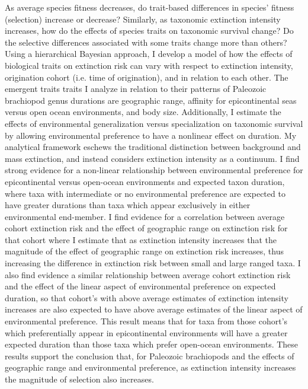 \documentclass[11pt]{article}
\begin{document}
  As average species fitness decreases, do trait-based differences in species' fitness (selection) increase or decrease? Similarly, as taxonomic extinction intensity increases, how do the effects of species traits on taxonomic survival change? Do the selective differences associated with some traits change more than others? Using a hierarchical Bayesian approach, I develop a model of how the effects of biological traits on extinction risk can vary with respect to extinction intensity, origination cohort (i.e. time of origination), and in relation to each other. The emergent traits traits I analyze in relation to their patterns of Paleozoic brachiopod genus durations are geographic range, affinity for epicontinental seas versus open ocean environments, and body size. Additionally, I estimate the effects of environmental generalization versus specialization on taxonomic survival by allowing environmental preference to have a nonlinear effect on duration. My analytical framework eschews the traditional distinction between background and mass extinction, and instead considers extinction intensity as a continuum. I find strong evidence for a non-linear relationship between environmental preference for epicontinental versus open-ocean environments and expected taxon duration, where taxa with intermediate or no environmental preference are expected to have greater durations than taxa which appear exclusively in either environmental end-member. I find evidence for a correlation between average cohort extinction risk and the effect of geographic range on extinction risk for that cohort where I estimate that as extinction intensity increases that the magnitude of the effect of geographic range on extinction risk increases, thus increasing the difference in extinction risk between small and large ranged taxa. I also find evidence a similar relationship between average cohort extinction risk and the effect of the linear aspect of environmental preference on expected duration, so that cohort's with above average estimates of extinction intensity increases are also expected to have above average estimates of the linear aspect of environmental preference. This result means that for taxa from those cohort's which preferentially appear in epicontinental environments will have a greater expected duration than those taxa which prefer open-ocean environments. These results support the conclusion that, for Paleozoic brachiopods and the effects of geographic range and environmental preference, as extinction intensity increases the magnitude of selection also increases.
\end{document}
